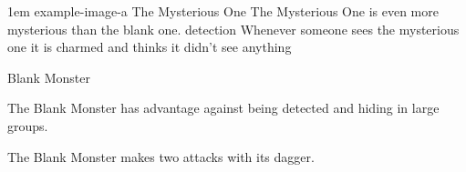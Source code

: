 \documentclass[letterpaper,openany,oneside,twocolumn]{book}
\begin{document}
\vfill\eject

\MonsterVariant%
	{1em}%
	{example-image-a}%
	{The Mysterious One}%
	{%
		The Mysterious One is even more mysterious than the blank one.
		detection
		Whenever someone sees the mysterious one it is charmed and thinks it didn't see anything
	}%

\begin{DndMonster}[width=0.5\textwidth]{Blank Monster}

    \DndMonsterBasics[
        armor-class = {10},
        hit-points  = {\DndDice{1d12 + 6}},
        speed       = {30 ft., climb 25 ft.},
    ]

    \DndMonsterAbilityScores[
    ]

    \DndMonsterDetails[
        challenge = 1,
    ]
    
    The Blank Monster has advantage against being detected and hiding in large groups.
	
	The Blank Monster makes two attacks with its dagger.
	
	\DndMonsterAttack[
      name=Dagger,
      distance=melee, %
      mod=+3,
      reach=10,
      targets=one target,
      dmg=\DndDice{1d8 + 2},
      dmg-type=slashing,
    ]
      
\end{DndMonster}
\end{document}
